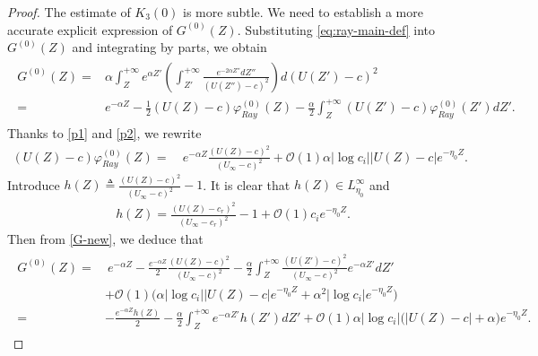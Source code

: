 \documentclass[reqno,11pt]{amsart}
\numberwithin{equation}{section}
\numberwithin{equation}{section}
\theoremstyle{plain}
\begin{document}
\begin{proof}
		
The estimate of $K_3(0)$ is more subtle. We need to establish a more accurate explicit expression of $G^{(0)}(Z)$. Substituting \eqref{eq:ray-main-def} into $G^{(0)}(Z)$ and integrating by parts, we obtain
			\begin{align}\label{G-new}\begin{aligned}
					G^{(0)}(Z) =& \alpha\int_{Z}^{+\infty}e^{\alpha Z'}\left(\int_{Z'}^{+\infty}\frac{e^{-2\alpha Z''}d Z''}{(U(Z'')-c)^2}\right)d(U(Z')-c)^2\\
					=& e^{-\alpha Z}-\frac{1}{2}(U(Z)-c)\varphi_{Ray}^{(0)}(Z)
					-\frac{\alpha}{2}\int_{Z}^{+\infty}(U(Z')-c)\varphi_{Ray}^{(0)}(Z')dZ'.
			\end{aligned}\end{align}
			Thanks to \eqref{p1} and \eqref{p2}, we rewrite
			\begin{align*}
				(U(Z)-c)\varphi_{Ray}^{(0)}(Z)= &~ e^{-\alpha Z}\frac{(U(Z)-c)^2}{(U_\infty-c)^2}+\mathcal{O}(1)\alpha|\log c_i||U(Z)-c|e^{-\eta_0 Z}.
			\end{align*}
	Introduce $h(Z)\triangleq \frac{(U(Z)-c)^2}{(U_\infty-c)^2}-1$. It is clear that $h(Z) \in L^\infty_{\eta_0}$ and 
			\begin{align}\label{def-h}
			h(Z)= \frac{(U(Z)-c_r)^2}{(U_\infty-c_r)^2}-1+\mathcal{O}(1)c_ie^{-\eta_0 Z}.
			\end{align}
	Then from \eqref{G-new}, we deduce that
			\begin{align}\label{G-exp}\begin{aligned}
					G^{(0)}(Z)= &~e^{-\alpha Z}-\frac{e^{-\alpha Z}}{2}\frac{(U(Z)-c)^2}{(U_\infty-c)^2}-\frac{\alpha}{2}\int_{Z}^{+\infty}\frac{(U(Z')-c)^2}{(U_\infty-c)^2}e^{-\alpha Z'}dZ'\\
					&+\mathcal{O}(1)\big(\alpha|\log c_i||U(Z)-c|e^{-\eta_0 Z}+\alpha^2|\log c_i|e^{-\eta_0 Z}\big)\\
					=&-\frac{ e^{-\alpha Z}h(Z)}{2}-\frac{\alpha}{2}\int_{Z}^{+\infty}%
					e^{-\alpha Z'}h(Z')dZ'+\mathcal{O}(1)\alpha|\log c_i|\big(|U(Z)-c|+\alpha\big)e^{-\eta_0 Z}.

\end{aligned}
\end{align}
\end{proof}
\end{document}
